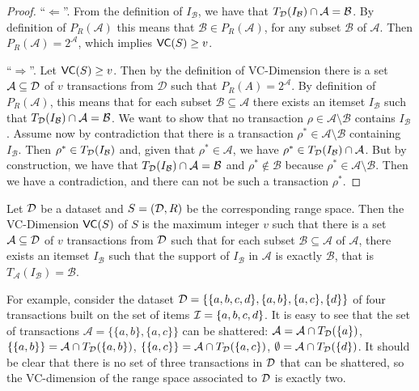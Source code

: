 \begin{proof} ``$\Leftarrow$''.
  From the definition of $I_\mathcal{B}$, we have that
  $T_{\cal D}(I_\mathcal{B})\cap\mathcal{A}=\mathcal{B}$. By definition of
  $P_R(\mathcal{A})$ this means that $\mathcal{B}\in P_R(\mathcal{A})$, for any
  subset $\mathcal{B}$ of $\mathcal{A}$. Then $P_R(\mathcal{A})=2^\mathcal{A}$,
  which implies $\mathsf{VC}(S)\ge v$.

  ``$\Rightarrow$''. Let $\mathsf{VC}(S)\ge v$. Then by the definition of VC-Dimension there
  is a set $\mathcal{A}\subseteq{\cal D}$ of $v$ transactions from $\mathcal{D}$ such
  that $P_R(A)=2^{\mathcal{A}}$. By definition of $P_R(\mathcal{A})$, this means
  that for each subset $\mathcal{B}\subseteq\mathcal{A}$ there exists an itemset
  $I_\mathcal{B}$ such that $T_{\cal D}(I_\mathcal{B})\cap\mathcal{A}=\mathcal{B}$.
  We want to show that no transaction $\rho\in\mathcal{A}\setminus\mathcal{B}$
  contains $I_\mathcal{B}$. Assume now by contradiction that there is a
  transaction $\rho^*\in\mathcal{A}\setminus\mathcal{B}$ containing
  $I_\mathcal{B}$. Then $\rho^*\in T_{\cal D}(I_\mathcal{B})$ and, given that
  $\rho^*\in\mathcal{A}$, we have $\rho^*\in
  T_{\cal D}(I_\mathcal{B})\cap\mathcal{A}$. But by construction, we have that
  $T_{\cal D}(I_\mathcal{B})\cap\mathcal{A}=\mathcal{B}$ and
  $\rho^*\notin\mathcal{B}$ because $\rho^*\in\mathcal{A}\setminus\mathcal{B}$.
  Then we have a contradiction, and there can not be such a transaction
  $\rho^*$.
\end{proof}

\begin{corollary} Let ${\cal D}$ be a dataset and $S=({\cal D},R)$ be the corresponding
  range space. Then the VC-Dimension $\mathsf{VC}(S)$ of $S$ is the maximum integer
  $v$ such that there is a set $\mathcal{A}\subseteq{\cal D}$ of $v$ transactions
  from ${\cal D}$ such that for each subset $\mathcal{B}\subseteq\mathcal{A}$ of
  $\mathcal{A}$, there exists an itemset $I_\mathcal{B}$ such that the support
  of $I_\mathcal{B}$ in $\mathcal{A}$ is exactly $\mathcal{B}$, that is
  $T_\mathcal{A}(I_\mathcal{B})=\mathcal{B}$.
\end{corollary}

For example, consider the dataset ${\cal D}=\{\{a,b,c,d\},\{a,b\},\{a,c\},\{d\}\}$ of
four transactions built on the set of items ${\cal I}=\{a,b,c,d\}$. It is easy to see
that the set of transactions $\mathcal{A}=\{\{a,b\},\{a,c\}\}$ can be shattered:
$\mathcal{A}=\mathcal{A}\cap T_{\cal D}(\{a\})$, $\{\{a,b\}\}=\mathcal{A}\cap
T_{\cal D}(\{a,b\})$, $\{\{a,c\}\}=\mathcal{A}\cap T_{\cal D}(\{a,c\})$,
$\emptyset=\mathcal{A}\cap T_{\cal D}(\{d\})$. It should be clear that there is no
set of three transactions in ${\cal D}$ that can be shattered, so the VC-dimension of
the range space associated to ${\cal D}$ is exactly two.

